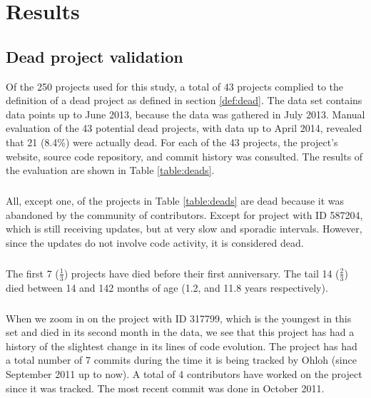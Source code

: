 \chapter{Results}
\label{results}

\section{Dead project validation}
\label{section:deads}
Of the 250 projects used for this study, a total of 43 projects complied to the
definition of a dead project as defined in section \ref{def:dead}. The data set
contains data points up to June 2013, because the data was gathered in July
2013. Manual evaluation of the 43 potential dead projects, with data up to April
2014, revealed that 21 (8.4\%) were actually dead.
For each of the 43 projects, the project's website, source code repository, and
commit history was consulted. The results of the evaluation are shown in Table
\ref{table:deads}.



\paragraph{}
All, except one, of the projects in Table \ref{table:deads} are dead because it
was abandoned by the community of contributors. Except for project with ID
587204, which is still receiving updates, but at very slow and sporadic
intervals. However, since the updates do not involve code activity, it is
considered dead.

\paragraph{}
The first 7 ($\frac{1}{3}$) projects have died before their first anniversary.
The tail 14 ($\frac{2}{3}$) died between 14 and 142 months of age (1.2, and
11.8 years respectively).

\paragraph{}
When we zoom in on the project with ID 317799, which is the youngest in this set
and died in its second month in the data, we see that this project has had a
history of the slightest change in its lines of code evolution. The project has
had a total number of 7 commits during the time it is being tracked by Ohloh
(since September 2011 up to now). A total of 4 contributors have worked on the
project since it was tracked. The most recent commit was done in October 2011.

